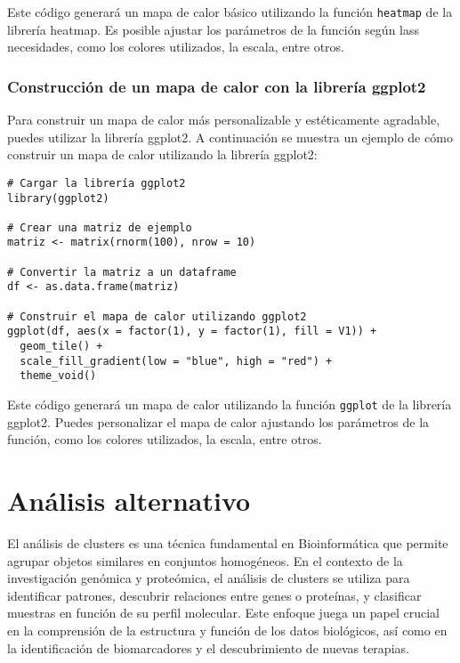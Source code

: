 \documentclass{article}
\begin{document}
Este código generará un mapa de calor básico utilizando la función \texttt{heatmap} de la librería heatmap.  Es posible ajustar los parámetros de la función según lass necesidades, como los colores utilizados, la escala, entre otros.

\subsubsection{Construcción de un mapa de calor con la librería ggplot2}

Para construir un mapa de calor más personalizable y estéticamente agradable, puedes utilizar la librería ggplot2. A continuación se muestra un ejemplo de cómo construir un mapa de calor utilizando la librería ggplot2:

\begin{verbatim}
# Cargar la librería ggplot2
library(ggplot2)

# Crear una matriz de ejemplo
matriz <- matrix(rnorm(100), nrow = 10)

# Convertir la matriz a un dataframe
df <- as.data.frame(matriz)

# Construir el mapa de calor utilizando ggplot2
ggplot(df, aes(x = factor(1), y = factor(1), fill = V1)) +
  geom_tile() +
  scale_fill_gradient(low = "blue", high = "red") +
  theme_void()
\end{verbatim}

Este código generará un mapa de calor utilizando la función \texttt{ggplot} de la librería ggplot2. Puedes personalizar el mapa de calor ajustando los parámetros de la función, como los colores utilizados, la escala, entre otros.



\section{An\'alisis alternativo}

El análisis de clusters es una técnica fundamental en Bioinformática que permite agrupar objetos similares en conjuntos homogéneos. En el contexto de la investigación genómica y proteómica, el análisis de clusters se utiliza para identificar patrones, descubrir relaciones entre genes o proteínas, y clasificar muestras en función de su perfil molecular. Este enfoque juega un papel crucial en la comprensión de la estructura y función de los datos biológicos, así como en la identificación de biomarcadores y el descubrimiento de nuevas terapias. 
\end{document}
